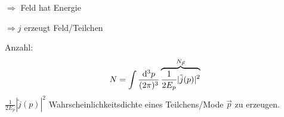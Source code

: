 $\Rightarrow$ Feld hat Energie
	
$\Rightarrow j$ erzeugt Feld/Teilchen

Anzahl:
	\begin{align*}
		N = \int \frac{\diff^3 p}{(2 \pi)^3} \overbrace{\frac{1}{2E_p} | \tilde{j}(p)|^2}^{\mathclap{N_{\vec{p}}}}
	\end{align*}
$\frac{1}{2E_p} | \tilde{j}(p)|^2$ Wahrscheinlichkeitsdichte eines Teilchens/Mode $\vec{p}$ zu erzeugen.